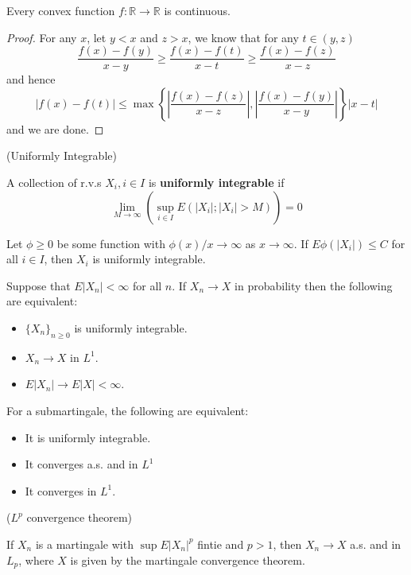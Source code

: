 \begin{proposition}
    Every convex function $f:\mathbb{R} \to \mathbb{R}$ is continuous. 
\end{proposition}
\begin{proof}
    For any $x$, let $y < x$ and $z >x$, we know that for any $t\in (y,z)$
    \[
    \dfrac{f(x)-f(y)}{x-y} \geq \dfrac{f(x)-f(t)}{x-t} \geq \dfrac{f(x)-f(z)}{x-z}
    \]
    and hence
    \[
    |f(x) - f(t)| \leq \max\left\{\left|\dfrac{f(x)-f(z)}{x-z}\right|,\left|\dfrac{f(x)-f(y)}{x-y}\right|\right\}|x-t|
    \]
    and we are done.
\end{proof}

\begin{definition}
    (Uniformly Integrable)\par
    A collection of r.v.s $X_i, i\in I$ is \textbf{uniformly integrable} if
    \[\lim_{M\to\infty} \left(\sup_{i\in I} E(|X_i|;|X_i| > M)\right) = 0\]    
\end{definition}

\begin{theorem}
    Let $\phi \geq 0$ be some function with $\phi(x)/x \to \infty$ as $x\to\infty$. If $E\phi(|X_i|) \leq C$ for all $i\in I$, then $X_i$ is uniformly integrable.
\end{theorem}

\begin{proposition}
    Suppose that $E|X_n| < \infty$ for all $n$. If $X_n \to X$ in probability then the following are equivalent:
    \begin{itemize}
        \item $\{X_n\}_{n\geq 0}$ is uniformly integrable.
        \item $X_n \to X$ in $L^1$.
        \item $E|X_n| \to E|X| < \infty$.
    \end{itemize}
\end{proposition}

\begin{theorem}
    For a submartingale, the following are equivalent:
    \begin{itemize}
        \item It is uniformly integrable.
        \item It converges a.s. and in $L^1$
        \item It converges in $L^1$.
    \end{itemize}
\end{theorem}

\begin{theorem}
    ($L^p$ convergence theorem)\par
    If $X_n$ is a martingale with $\sup E|X_n|^p$ fintie and $p>1$, then $X_n \to X$ a.s. and in $L_p$, where $X$ is given by the martingale convergence theorem.
\end{theorem}


